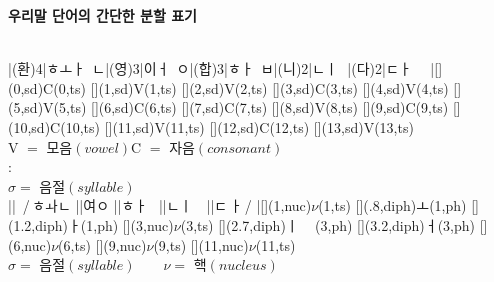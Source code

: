 \documentclass{article} %
\begin{document}
\begin{CJK}{UTF8}{mj}
\noindent
\center
\bf 우리말 단어의 간단한 분할 표기\\[3em]
\sf{}\\[2em]

\tiershortcuts %

\asr[reptype=nots,sd=(ph) -.5em (sound)]
|\qsyl({환})4|{ㅎ}{ㅗ}{ㅏ \,}{ㄴ}|\qsyl({영})3|{이}{ㅓ \,}{ㅇ}|\qsyl({합})3|{ㅎ}{ㅏ \,}{ㅂ}|\qsyl({니})2|{ㄴ}{ㅣ\ \,}|\qsyl({다})2|{ㄷ}{ㅏ\ \ }
|\@[\sdoff](0,sd){C}\-(0,ts)
\@[\sdoff](1,sd){V}\-(1,ts)
\@[\sdoff](2,sd){V}\-(2,ts)
\@[\sdoff](3,sd){C}\-(3,ts)
\@[\sdoff](4,sd){V}\-(4,ts)
\@[\sdoff](5,sd){V}\-(5,ts)
\@[\sdoff](6,sd){C}\-(6,ts)
\@[\sdoff](7,sd){C}\-(7,ts)
\@[\sdoff](8,sd){V}\-(8,ts)
\@[\sdoff](9,sd){C}\-(9,ts)
\@[\sdoff](10,sd){C}\-(10,ts)
\@[\sdoff](11,sd){V}\-(11,ts)
\@[\sdoff](12,sd){C}\-(12,ts)
\@[\sdoff](13,sd){V}\-(13,ts)
\endasr\\[1em]

\small
V $=$ 모음$(vowel)$\qquad C $=$ 자음$(consonant)$\\[2em]

\normalsize
\asr[tssym=\small{$\bullet$}]:
\endasr\\[1em] %
\small
$\sigma=$ 음절$(syllable)$\\[2em]

\normalsize
\tiershortcuts
\asr[style=bigsyls,nuc=(sy) 1em ($\nu$),diph=(ph) -2em (monoph)]
||{\ /\,ㅎ}{ㅘ}{ㄴ}
||{여}{ㅇ}
||{ㅎ}{ㅏ \,}{} %
||{ㄴ}{ㅣ\ \,}
||{ㄷ}{\,ㅏ\,/}
|\@[\nucoff](1,nuc){$\nu$}\-(1,ts)
\@[\diphoffA](.8,diph){ㅗ}\-(1,ph)
\@[\diphoffB](1.2,diph){ㅏ}\-(1,ph)
\@[\nucoff](3,nuc){$\nu$}\-(3,ts)
\@[\diphoffB](2.7,diph){ㅣ\ \ \,}\-(3,ph)
\@[\diphoffB](3.2,diph){ㅓ}\-(3,ph)
\@[\nucoff](6,nuc){$\nu$}\-(6,ts)
\@[\nucoff](9,nuc){$\nu$}\-(9,ts)
\@[\nucoff](11,nuc){$\nu$}\-(11,ts)
\endasr\\[.7em]

\small
\hspace{3.2cm}  %
$\sigma=$ 음절$(syllable)\qquad\nu=$ 핵$(nucleus)$
\end{CJK}
\end{document}
